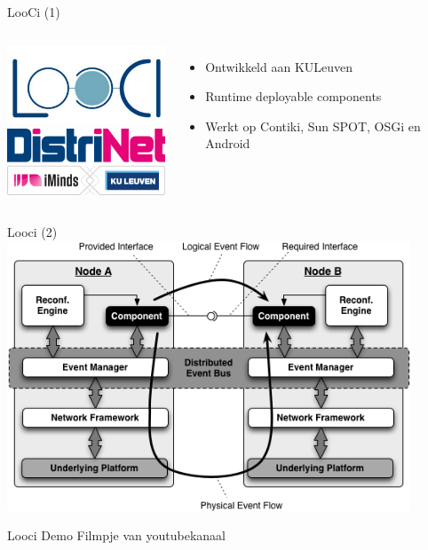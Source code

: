 \documentclass[presentation, bigger]{beamer}
\begin{document}
\begin{frame}[label=sec-2-3]{LooCi (1)}
\begin{columns}[t]
\centering
\includegraphics[width=5cm,keepaspectration=true]{looci/looci.png}\\
\includegraphics[width=5cm,keepaspectration=true]{looci/distrinet.png}
\centering
\begin{itemize}
\item Ontwikkeld aan KULeuven
\item Runtime deployable components
\item Werkt op Contiki, Sun SPOT, OSGi en Android
\end{itemize}
\end{columns}
\end{frame}

\begin{frame}[label=sec-2-4]{Looci (2)}
\centering
\includegraphics[width=0.9\textwidth,keepaspectration=true]{looci/LooCIExecEnvironment.png}
\end{frame}

\begin{frame}[label=sec-2-5]{Looci Demo}
Filmpje van youtubekanaal
\end{frame}
\end{document}
